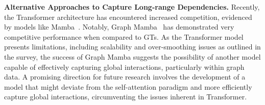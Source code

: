 \textbf{Alternative Approaches to Capture Long-range Dependencies.} Recently, the Transformer architecture has encountered increased competition, evidenced by models like Mamba~\cite{gu2023mamba}. Notably, Graph Mamba~\cite{behrouz2024graph} has demonstrated very competitive performance when compared to GTs. As the Transformer model presents limitations, including scalability and over-smoothing issues as outlined in the survey, the success of Graph Mamba suggests the possibility of another model capable of effectively capturing global interactions, particularly within graph data. A promising direction for future research involves the development of a model that might deviate from the self-attention paradigm and more efficiently capture global interactions, circumventing the issues inherent in  Transformer.










